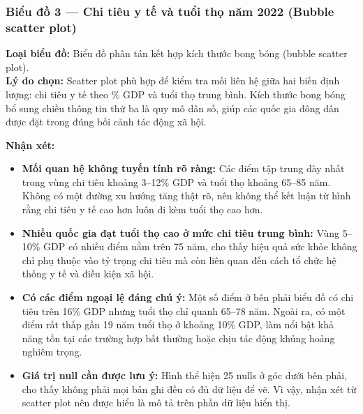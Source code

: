 \subsubsection{Biểu đồ 3 --- Chi tiêu y tế và tuổi thọ năm 2022 (Bubble scatter plot)}

\textbf{Loại biểu đồ:} Biểu đồ phân tán kết hợp kích thước bong bóng (bubble scatter plot).\\
\textbf{Lý do chọn:} Scatter plot phù hợp để kiểm tra mối liên hệ giữa hai biến định lượng: chi tiêu y tế theo \% GDP và tuổi thọ trung bình. Kích thước bong bóng bổ sung chiều thông tin thứ ba là quy mô dân số, giúp các quốc gia đông dân được đặt trong đúng bối cảnh tác động xã hội.


\textbf{Nhận xét:}
\begin{itemize}
    \item \textbf{Mối quan hệ không tuyến tính rõ ràng:} Các điểm tập trung dày nhất trong vùng chi tiêu khoảng 3--12\% GDP và tuổi thọ khoảng 65--85 năm. Không có một đường xu hướng tăng thật rõ, nên không thể kết luận từ hình rằng chi tiêu y tế cao hơn luôn đi kèm tuổi thọ cao hơn.
    \item \textbf{Nhiều quốc gia đạt tuổi thọ cao ở mức chi tiêu trung bình:} Vùng 5--10\% GDP có nhiều điểm nằm trên 75 năm, cho thấy hiệu quả sức khỏe không chỉ phụ thuộc vào tỷ trọng chi tiêu mà còn liên quan đến cách tổ chức hệ thống y tế và điều kiện xã hội.
    \item \textbf{Có các điểm ngoại lệ đáng chú ý:} Một số điểm ở bên phải biểu đồ có chi tiêu trên 16\% GDP nhưng tuổi thọ chỉ quanh 65--78 năm. Ngoài ra, có một điểm rất thấp gần 19 năm tuổi thọ ở khoảng 10\% GDP, làm nổi bật khả năng tồn tại các trường hợp bất thường hoặc chịu tác động khủng hoảng nghiêm trọng.
    \item \textbf{Giá trị null cần được lưu ý:} Hình thể hiện 25 nulls ở góc dưới bên phải, cho thấy không phải mọi bản ghi đều có đủ dữ liệu để vẽ. Vì vậy, nhận xét từ scatter plot nên được hiểu là mô tả trên phần dữ liệu hiển thị.
\end{itemize}

